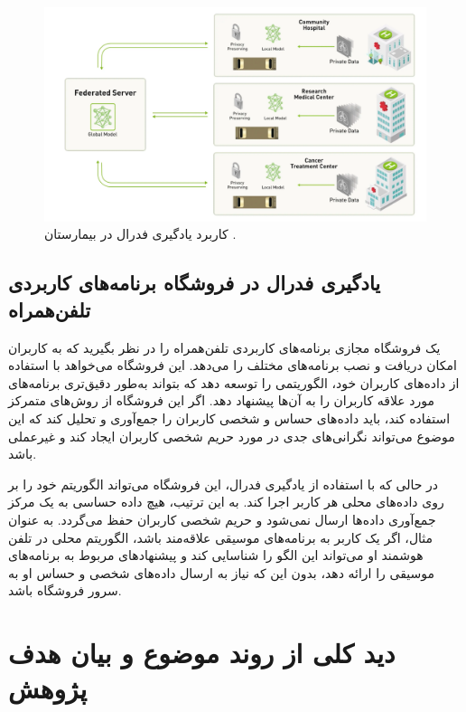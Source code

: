 \begin{figure}[b!]
	\centering
	\includegraphics[scale=1]{images/chap1/hospital.png}%
	\caption{%
		کاربرد یادگیری فدرال در بیمارستان
		\cite{rieke2019what}%
		.
	}
	\label{hospital}
	\centering
\end{figure}



\subsection{
	یادگیری فدرال در فروشگاه برنامه‌های کاربردی%
	تلفن‌همراه
}
یک فروشگاه مجازی برنامه‌های کاربردی تلفن‌همراه را در نظر بگیرید که به کاربران امکان دریافت و نصب برنامه‌های مختلف را می‌دهد. این فروشگاه می‌خواهد با استفاده از داده‌های کاربران خود، الگوریتمی را توسعه دهد که بتواند به‌طور دقیق‌تری برنامه‌های مورد علاقه کاربران را به آن‌ها پیشنهاد دهد. اگر این فروشگاه از روش‌های متمرکز استفاده کند، باید داده‌های حساس و شخصی کاربران را جمع‌آوری و تحلیل کند که این موضوع می‌تواند نگرانی‌های جدی در مورد حریم شخصی کاربران ایجاد کند و غیرعملی باشد.

در حالی که با استفاده از یادگیری فدرال، این فروشگاه می‌تواند الگوریتم خود را بر روی داده‌های محلی هر کاربر اجرا کند. به این ترتیب، هیچ داده حساسی به یک مرکز جمع‌آوری داده‌ها ارسال نمی‌شود و حریم شخصی کاربران حفظ می‌گردد. به عنوان مثال، اگر یک کاربر به برنامه‌های موسیقی علاقه‌مند باشد، الگوریتم محلی در تلفن هوشمند او می‌تواند این الگو را شناسایی کند و پیشنهادهای مربوط به برنامه‌های موسیقی را ارائه دهد، بدون این که نیاز به ارسال داده‌های شخصی و حساس او به سرور فروشگاه باشد.


\section{دید کلی از روند موضوع و بیان هدف پژوهش}

